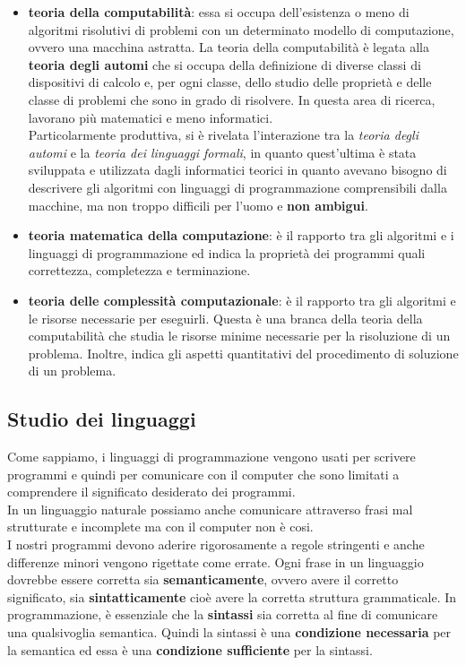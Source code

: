 \documentclass[12pt]{report}
\begin{document}
	\begin{itemize}
		\item \textbf{teoria della computabilità}: essa si occupa dell'esistenza o meno di algoritmi risolutivi di problemi con un determinato modello di computazione, ovvero una macchina astratta. La teoria della computabilità è legata alla \textbf{teoria degli automi} che si occupa della definizione di diverse classi di dispositivi di calcolo e, per ogni classe, dello studio delle proprietà e delle classe di problemi che sono in grado di risolvere. In questa area di ricerca, lavorano più matematici e meno informatici. \\
		Particolarmente produttiva, si è rivelata l'interazione tra la \textit{teoria degli automi} e la \textit{teoria dei linguaggi formali}, in quanto quest'ultima è stata sviluppata e utilizzata dagli informatici teorici in quanto avevano bisogno di descrivere gli algoritmi con linguaggi di programmazione comprensibili dalla macchine, ma non troppo difficili per l'uomo e \textbf{non ambigui}.
		\item \textbf{teoria matematica della computazione}: è il rapporto tra gli algoritmi e i linguaggi di programmazione ed indica la proprietà dei programmi quali correttezza, completezza e terminazione.
		\item \textbf{teoria delle complessità computazionale}: è il rapporto tra gli algoritmi e le risorse necessarie per eseguirli. Questa è una branca della teoria della computabilità che studia le risorse minime necessarie per la risoluzione di un problema. Inoltre, indica gli aspetti quantitativi del procedimento di soluzione di un problema.
	\end{itemize}
	\subsection{Studio dei linguaggi}
	Come sappiamo, i linguaggi di programmazione vengono usati per scrivere programmi e quindi per comunicare con il computer che sono limitati a comprendere il significato desiderato dei programmi. \\
	In un linguaggio naturale possiamo anche comunicare attraverso frasi mal strutturate e incomplete ma con il computer non è cosi. \\
	I nostri programmi devono aderire rigorosamente a regole stringenti e anche differenze minori vengono rigettate come errate. Ogni frase in un linguaggio dovrebbe essere corretta sia \textbf{semanticamente}, ovvero avere il corretto significato, sia \textbf{sintatticamente} cioè avere la corretta struttura grammaticale. In programmazione, è essenziale che la \textbf{sintassi} sia corretta al fine di comunicare una qualsivoglia semantica. Quindi la sintassi è una \textbf{condizione necessaria} per la semantica ed essa è una \textbf{condizione sufficiente} per la sintassi.
\end{document}

